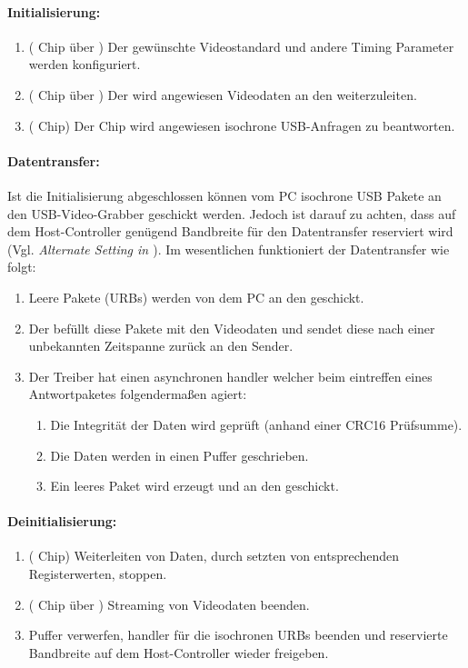 \paragraph{Initialisierung:}
\begin{enumerate}
 \item (\saa{} Chip über \iic{}) Der gewünschte Videostandard und andere Timing Parameter werden konfiguriert.
 \item (\saa{} Chip über \iic{}) Der \saa{} wird angewiesen Videodaten an den \stk{} weiterzuleiten.
 \item (\stk{} Chip) Der Chip wird angewiesen isochrone USB-Anfragen zu beantworten.
\end{enumerate}

\paragraph{Datentransfer:} Ist die Initialisierung abgeschlossen können vom PC isochrone USB Pakete an den USB-Video-Grabber
geschickt werden. Jedoch ist darauf zu achten, dass auf dem Host-Controller genügend Bandbreite für den Datentransfer reserviert wird
(Vgl. \emph{Alternate Setting in \autocite{standard:usb2}}). Im wesentlichen funktioniert der Datentransfer wie folgt:
\begin{enumerate}
 \item Leere Pakete (URBs) werden von dem PC an den \stk{} geschickt.
 \item Der \stk{} befüllt diese Pakete mit den Videodaten und sendet diese nach einer unbekannten Zeitspanne zurück an den Sender.
 \item Der Treiber hat einen asynchronen handler welcher beim eintreffen eines Antwortpaketes folgendermaßen agiert:
 \begin{enumerate}
  \item Die Integrität der Daten wird geprüft (anhand einer CRC16 Prüfsumme).
  \item Die Daten werden in einen Puffer geschrieben.
  \item Ein leeres Paket wird erzeugt und an den \stk{} geschickt. 
 \end{enumerate}
\end{enumerate}

\paragraph{Deinitialisierung:}
\begin{enumerate}
 \item (\stk{} Chip) Weiterleiten von Daten, durch setzten von entsprechenden Registerwerten, stoppen.
 \item (\saa{} Chip über \iic{}) Streaming von Videodaten beenden.
 \item Puffer verwerfen, handler für die isochronen URBs beenden und reservierte Bandbreite auf dem Host-Controller wieder freigeben.
\end{enumerate}

